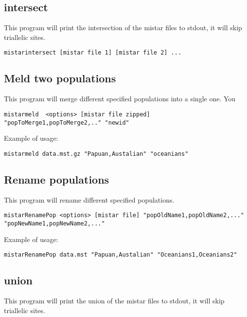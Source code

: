 \documentclass[a4paper]{article}
\begin{document}
\subsection{intersect}

This program will print the intersection of the mistar files to stdout, it will skip triallelic sites.

\begin{verbatim}
mistarintersect [mistar file 1] [mistar file 2] ...
\end{verbatim}

\subsection{Meld two populations}

This program will merge different specified populations into a single one. You 

\small
\begin{verbatim}
mistarmeld  <options> [mistar file zipped] "popToMerge1,popToMerge2,.." "newid"
\end{verbatim}
\normalsize

Example of usage:
\begin{verbatim}
mistarmeld data.mst.gz "Papuan,Austalian" "oceanians"
\end{verbatim}


\subsection{Rename populations}

This program will rename different specified populations.

\small
\begin{verbatim}
mistarRenamePop <options> [mistar file] "popOldName1,popOldName2,..." "popNewName1,popNewName2,..."
\end{verbatim}
\normalsize

Example of usage:
\begin{verbatim}
mistarRenamePop data.mst "Papuan,Austalian" "Oceanians1,Oceanians2"
\end{verbatim}

\subsection{union}

This program will print the union of the mistar files to stdout, it will skip triallelic sites.
\end{document}
